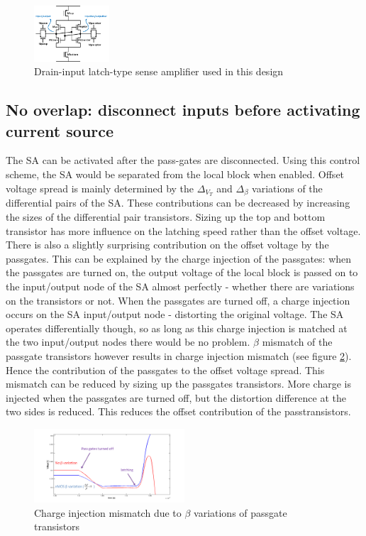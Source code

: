 \documentclass[journal]{IEEEtran}
\begin{document}
\begin{figure}[ht!]
  \centering
  \includegraphics[width=0.25\textwidth]{../fig/hfdstk-sensamp-ourSA2.png}
  \caption{Drain-input latch-type sense amplifier\cite{Cos09} used in this design}
  \label{fig:ourSA}
\end{figure}


\subsection{No overlap: disconnect inputs before activating current source}
The SA can be activated after the pass-gates are disconnected. Using this control scheme, the SA would be separated from the local block when enabled. Offset voltage spread is mainly determined by the $\Delta_{V_{T}}$ and $\Delta_{\beta}$ variations of the differential pairs of the SA. These contributions can be decreased by increasing the sizes of the differential pair transistors. Sizing up the top and bottom transistor has more influence on the latching speed rather than the offset voltage. There is also a slightly surprising contribution on the offset voltage by the passgates. This can be explained by the charge injection of the passgates: when the passgates are turned on, the output voltage of the local block is passed on to the input/output node of the SA almost perfectly - whether there are variations on the transistors or not. When the passgates are turned off, a charge injection occurs on the SA input/output node - distorting the original voltage. The SA operates differentially though, so as long as this charge injection is matched at the two input/output nodes there would be no problem. $\beta$ mismatch of the passgate transistors however results in charge injection mismatch (see figure \ref{fig:chargeinjection}). Hence the contribution of the passgates to the offset voltage spread. This mismatch can be reduced by sizing up the passgates transistors. More charge is injected when the passgates are turned off, but the distortion difference at the two sides is reduced. This reduces the offset contribution of the passtransistors.

\begin{figure}[ht!]
  \centering
  \includegraphics[width=0.5\textwidth]{../fig/hfdstk-sensamp-chargeinjectionmismatch.png}
  \caption{Charge injection mismatch due to $\beta$ variations of passgate transistors}
  \label{fig:chargeinjection}
\end{figure}
\end{document}

